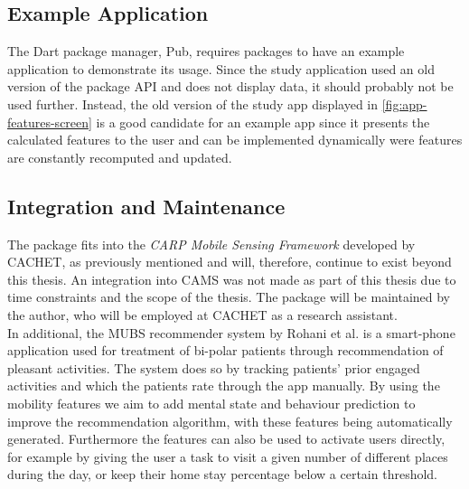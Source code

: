 \subsection{Example Application}
The Dart package manager, Pub, requires packages to have an example application to demonstrate its usage. Since the study application used an old version of the package API and does not display data, it should probably not be used further. Instead, the old version of the study app displayed in \ref{fig:app-features-screen} is a good candidate for an example app since it presents the calculated features to the user and can be implemented dynamically were features are constantly recomputed and updated.

\subsection{Integration and Maintenance}
The package fits into the \textit{CARP Mobile Sensing Framework} developed by CACHET, as previously mentioned and will, therefore, continue to exist beyond this thesis. An integration into CAMS was not made as part of this thesis due to time constraints and the scope of the thesis. The package will be maintained by the author, who will be employed at CACHET as a research assistant.\\

In additional, the MUBS recommender system by Rohani et al. \cite{mubs-rohani} is a smart-phone application used for treatment of bi-polar patients through recommendation of pleasant activities. The system does so by tracking patients' prior engaged activities and which the patients rate through the app manually. By using the mobility features we aim to add mental state and behaviour prediction to improve the recommendation algorithm, with these features being automatically generated. Furthermore the features can also be used to activate users directly, for example by giving the user a task to visit a given number of different places during the day, or keep their home stay percentage below a certain threshold.